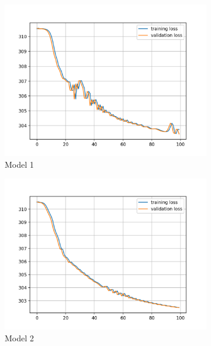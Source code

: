\documentclass[a4paper,10pt]{article}
\begin{document}
\begin{figure}[htbp]
  \centering
  \begin{subfigure}{0.3\textwidth}
    \includegraphics[width=\textwidth]{figures/assignment_3/segmentation_model1_hist.png}
    \caption{Model 1}
    \label{fig:image1}
  \end{subfigure}
  \hfill
  \begin{subfigure}{0.3\textwidth}
    \includegraphics[width=\textwidth]{figures/assignment_3/segmentation_model2_hist.png}
    \caption{Model 2}
    \label{fig:image2}
  \end{subfigure}
  \hfill
  \begin{subfigure}{0.3\textwidth}

\end{subfigure}
\end{figure}
\end{document}
